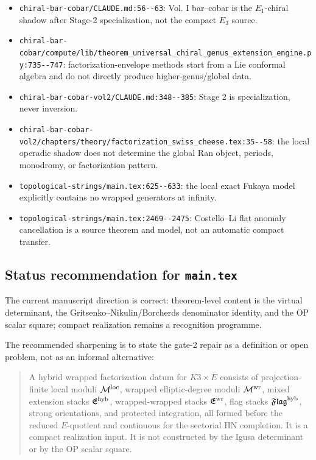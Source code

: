 \begin{itemize}
the character \(-\Delta_5^{-2}\) is numerical theorem-grade; its compact
critical-CoHA interpretation is conditional.
\item \verb|chiral-bar-cobar/CLAUDE.md:56--63|:
Vol. I bar--cobar is the \(E_1\)-chiral shadow after Stage-2
specialization, not the compact \(E_3\) source.
\item \verb|chiral-bar-cobar/compute/lib/theorem_universal_chiral_genus_extension_engine.py:735--747|:
factorization-envelope methods start from a Lie conformal algebra and do
not directly produce higher-genus/global data.
\item \verb|chiral-bar-cobar-vol2/CLAUDE.md:348--385|:
Stage 2 is specialization, never inversion.
\item \verb|chiral-bar-cobar-vol2/chapters/theory/factorization_swiss_cheese.tex:35--58|:
the local operadic shadow does not determine the global Ran object,
periods, monodromy, or factorization pattern.
\item \verb|topological-strings/main.tex:625--633|:
the local exact Fukaya model explicitly contains no wrapped generators
at infinity.
\item \verb|topological-strings/main.tex:2469--2475|:
Costello--Li flat anomaly cancellation is a source theorem and model,
not an automatic compact transfer.
\end{itemize}

\subsection{Status recommendation for \texttt{main.tex}}

The current manuscript direction is correct: theorem-level content is
the virtual determinant, the Gritsenko--Nikulin/Borcherds denominator
identity, and the OP scalar square; compact realization remains a
recognition programme.

The recommended sharpening is to state the gate-2 repair as a definition
or open problem, not as an informal alternative:

\begin{quote}
A hybrid wrapped factorization datum for \(K3\times E\) consists of
projection-finite local moduli \(\mathcal M^{\mathrm{loc}}\), wrapped elliptic-degree moduli
\(\mathcal M^{\mathrm{wr}}\), mixed extension stacks \(\mathfrak E^{\mathrm{hyb}}\), wrapped-wrapped stacks
\(\mathfrak E^{\mathrm{wr}}\), flag stacks \(\mathfrak{Flag}^{\mathrm{hyb}}\), strong orientations, and protected
integration, all formed before the reduced \(E\)-quotient and continuous
for the sectorial HN completion.  It is a compact realization input.
It is not constructed by the Igusa determinant or by the OP scalar
square.
\end{quote}

